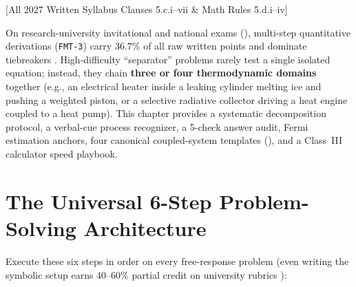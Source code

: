 [All 2027 Written Syllabus Clauses 5.c.i--vii \& Math Rules 5.d.i--iv]

On research-university invitational and national exams (), multi-step quantitative derivations (\texttt{FMT-3}) carry $\mathbf{36.7\%}$ of all raw written points and dominate tiebreakers . High-difficulty ``separator'' problems rarely test a single isolated equation; instead, they chain \textbf{three or four thermodynamic domains} together (e.g., an electrical heater inside a leaking cylinder melting ice and pushing a weighted piston, or a selective radiative collector driving a heat engine coupled to a heat pump). This chapter provides a systematic decomposition protocol, a verbal-cue process recognizer, a 5-check answer audit, Fermi estimation anchors, four canonical coupled-system templates (), and a Class~III calculator speed playbook.

\section{The Universal 6-Step Problem-Solving Architecture}\label{sec:19.1}

Execute these six steps in order on every free-response problem (even writing the symbolic setup earns $40\text{--}60\%$ partial credit on university rubrics ):

